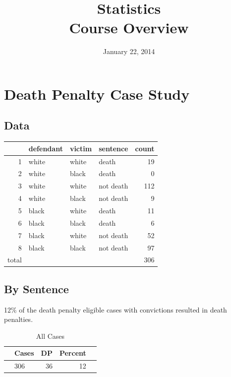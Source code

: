 \documentclass{exam}
\author{}
\date{January 22, 2014}
\title{Statistics \\ Course Overview}
\begin{document}
  \maketitle
  \section{Death Penalty Case Study}
  
  \subsection{Data}
  \begin{table}[ht]
  \centering
  \begin{tabular}{rlllr}
    \toprule
          & defendant & victim & sentence  & count \\
    \midrule
    1     & white & white & death     & 19 \\
    2     & white & black & death     & 0 \\
    3     & white & white & not death & 112 \\
    4     & white & black & not death & 9 \\
    5     & black & white & death     & 11 \\
    6     & black & black & death     & 6 \\
    7     & black & white & not death & 52 \\
    8     & black & black & not death & 97 \\
    \midrule
    total &       &       &           & 306 \\
    \bottomrule
  \end{tabular}
  \end{table}

  \subsection{By Sentence}

  12\% of the death penalty eligible cases with convictions resulted in death penalties.

  \begin{table}[H]
    \centering
    \begin{tabular}{rlrrr}
      \toprule
      & Cases & DP & Percent \\
      \midrule
      & 306   & 36 & 12 \\
     \bottomrule
    \end{tabular}
    \caption{All Cases}
  \end{table}
\end{document}
